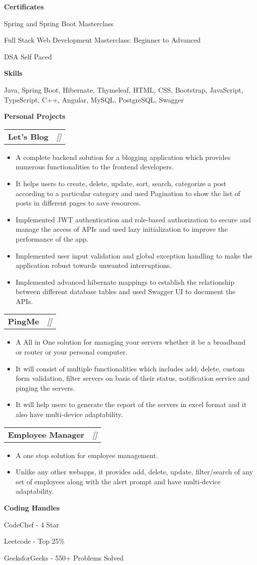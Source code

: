 \documentclass[a4paper,10pt]{article}
\makeatletter
\newcommand{\resitem}[1]{\item #1}
\newcommand{\resheading}[1]{\vspace{0.5em} {\small \colorbox{mygrey}{{\begin{minipage}{0.975\textwidth}{{\textbf{#1}}}\end{minipage}}}} \vspace{0.5em}}
\newcommand{\ressubheading}[3]{\begin{tabular*}{6.62in}{l @{\extracolsep{\fill}} r} \textbf{#1} & \textit{[#2]} \\ \end{tabular*}\vspace{-8pt}}
\makeatother
\begin{document}
\resheading{Certificates}
\resitem{Spring and Spring Boot Masterclass}
\resitem{Full Stack Web Development Masterclass: Beginner to Advanced}
\resitem{DSA Self Paced}

\resheading{Skills}
\resitem{Java, Spring Boot, Hibernate, Thymeleaf, HTML, CSS, Bootstrap, JavaScript, TypeScript, C++, Angular, MySQL, PostgreSQL, Swagger}

\resheading{Personal Projects}
\ressubheading{Let's Blog}{}{}
\begin{itemize}
    \resitem{A complete backend solution for a blogging application which provides numerous functionalities to the frontend developers.}
    \resitem{It helps users to create, delete, update, sort, search, categorize a post according to a particular category and used Pagination to show the list of posts in different pages to save resources.}
    \resitem{Implemented JWT authentication and role-based authorization to secure and manage the access of APIs and used lazy initialization to improve the performance of the app.}
    \resitem{Implemented user input validation and global exception handling to make the application robust towards unwanted interruptions.}
    \resitem{Implemented advanced hibernate mappings to establish the relationship between different database tables and used Swagger UI to document the APIs.}
\end{itemize}
\ressubheading{PingMe}{}{}
\begin{itemize}
    \resitem{A All in One solution for managing your servers whether it be a broadband or router or your personal computer.}
    \resitem{It will consist of multiple functionalities which includes add, delete, custom form validation, filter servers on basis of their status, notification service and pinging the servers.}
    \resitem{It will help users to generate the report of the servers in excel format and it also have multi-device adaptability.}
\end{itemize}
\ressubheading{Employee Manager}{}{}
\begin{itemize}
    \resitem{A one stop solution for employee management.}
    \resitem{Unlike any other webapps, it provides add, delete, update, filter/search of any set of employees along with the alert prompt and have multi-device adaptability.}
\end{itemize}

\resheading{Coding Handles}
\resitem{CodeChef - 4 Star}
\resitem{Leetcode - Top 25\%}
\resitem{GeeksforGeeks - 550+ Problems Solved}
\end{document}
